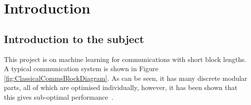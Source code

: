 \documentclass[12pt,onecolumn,letterpaper]{article}
\begin{document}
\pagebreak


\tableofcontents
\pagebreak

\FloatBarrier
\section{Introduction}

\subsection{Introduction to the subject}

This project is on machine learning for communications with short block lengths. A typical communication system is shown in Figure \ref{fig:ClassicalCommsBlockDiagram}. As can be seen, it has many discrete modular parts, all of which are optimised individually, however, it has been shown that this gives sub-optimal performance~\cite{ChannelEncodingOptimality}.
\end{document}
